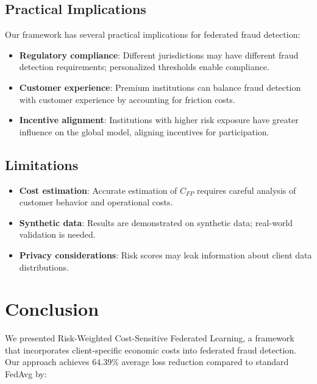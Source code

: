 \documentclass[conference]{IEEEtran}
\begin{document}
\subsection{Practical Implications}

Our framework has several practical implications for federated fraud detection:

\begin{itemize}
    \item \textbf{Regulatory compliance}: Different jurisdictions may have different fraud detection requirements; personalized thresholds enable compliance.
    
    \item \textbf{Customer experience}: Premium institutions can balance fraud detection with customer experience by accounting for friction costs.
    
    \item \textbf{Incentive alignment}: Institutions with higher risk exposure have greater influence on the global model, aligning incentives for participation.
\end{itemize}

\subsection{Limitations}

\begin{itemize}
    \item \textbf{Cost estimation}: Accurate estimation of $C_{FP}$ requires careful analysis of customer behavior and operational costs.
    
    \item \textbf{Synthetic data}: Results are demonstrated on synthetic data; real-world validation is needed.
    
    \item \textbf{Privacy considerations}: Risk scores may leak information about client data distributions.
\end{itemize}

\section{Conclusion}
\label{sec:conclusion}

We presented Risk-Weighted Cost-Sensitive Federated Learning, a framework that incorporates client-specific economic costs into federated fraud detection. Our approach achieves 64.39\% average loss reduction compared to standard FedAvg by:
\end{document}
